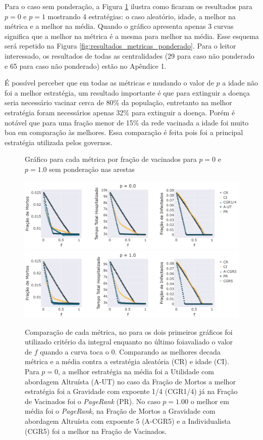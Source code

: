 Para o caso sem ponderação, a Figura \ref{fig:resultados_metricas} ilustra 
como ficaram os resultados para $p = 0$ e $p = 1$ mostrando 4 
estratégias: 
o caso aleatório, idade, a melhor na métrica e a melhor na média. 
Quando o gráfico apresenta apenas 3 curvas significa que a melhor na métrica é a mesma para melhor na média. Esse esquema será repetido na Figura \ref{fig:resultados_metricas_ponderado}.
Para o leitor interessado, os resultados de todas as centralidades 
(29 para caso não ponderado e 65 para caso não ponderado) 
estão no Apêndice 1.

É possível perceber que em todas as métricas e mudando o valor de $p$ a idade não foi a melhor estratégia, um resultado importante é que para extinguir a doença seria necessário vacinar cerca de 80\% da população, entretanto na melhor estratégia foram necessários apenas 32\% para extinguir a doença. Porém é notável que para uma fração menor de 15\% da rede vacinada a idade foi muito boa em comparação às melhores. 
Essa comparação é feita pois foi a principal estratégia utilizada pelos governos.


\begin{figure}[H]
    \centering
    \captionsetup{font=normalsize,skip=0.8pt,singlelinecheck=on,labelsep=endash}
    \caption{Gráfico para cada métrica por fração de vacinados para $p = 0$ e $p = 1.0$ sem ponderação nas arestas}
    \includegraphics[scale= 0.3]{figuras/compara_p_f_nponderado_0.0.png}
    \includegraphics[scale= 0.3]{figuras/compara_p_f_nponderado_1.0.png}
    \captionsetup{font=small,justification=justified}
    
    \caption*{Comparação de cada métrica, no para os dois primeiros gráficos foi utilizado  critério da integral enquanto no último foiavaliado o valor de $f$ quando a curva toca o 0. Comparando as melhores decada métrica e a média contra a estratégia aleatória (CR) e  idade (CI). Para $p = 0$, a melhor estratégia 
    na média
    foi a Utilidade com abordagem Altruísta (A-UT) no caso da Fração de Mortos a melhor estratégia foi a Gravidade com expoente 1/4 (CGR1/4) já na Fração de Vacinados foi o \textit{PageRank} (PR). No caso $p = 1.00$ o melhor em média foi o  \textit{PageRank}, na Fração de Mortos a Gravidade com abordagem Altruísta com expoente 5 (A-CGR5) e a Individualista (CGR5) foi a melhor na Fração de Vacinados.}
    \label{fig:resultados_metricas}
\end{figure}

